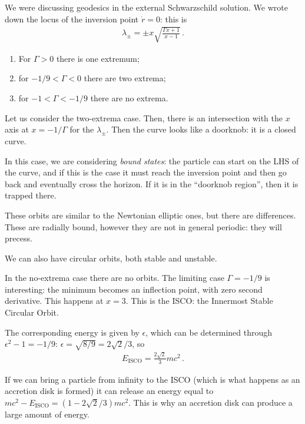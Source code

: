 \documentclass[main.tex]{subfiles}
\begin{document}


We were discussing geodesics in the external Schwarzschild solution. 
We wrote down the locus of the inversion point \(\dot{r} = 0\): this is 
%
\begin{align}
\lambda_{\pm} = \pm x \sqrt{\frac{\Gamma x + 1}{x-1}}
\,.
\end{align}

\begin{enumerate}
    \item For \(\Gamma > 0\) there is one extremum;
    \item for \(- 1/9 < \Gamma < 0\) there are two extrema;
    \item for \(-1 < \Gamma < - 1/9\) there are no extrema. 
\end{enumerate}

Let us consider the two-extrema case. Then, there is an intersection with the \(x\) axis at \(x = - 1/ \Gamma \) for the \(\lambda_{\pm }\). 
Then the curve looks like a doorknob: it is a closed curve. 

In this case, we are considering \emph{bound states}: the particle can start on the LHS of the curve, and if this is the case it must reach the inversion point and then go back and eventually cross the horizon.
If it is in the ``doorknob region'', then it is trapped there. 

These orbits are similar to the Newtonian elliptic ones, but there are differences. These are radially bound, however they are not in general periodic: they will precess.

We can also have circular orbits, both stable and unstable. 

In the no-extrema case there are no orbits. The limiting case \(\Gamma = - 1/9\) is interesting: the minimum becomes an inflection point, with zero second derivative.  
This happens at \(x = 3\). 
This is the ISCO: the Innermost Stable Circular Orbit.

The corresponding energy is given by \(\epsilon \), which can be determined through \(\epsilon^2 - 1 = - 1/9\): \(\epsilon = \sqrt{8/9} =  2 \sqrt{2}  /3\), so 
%
\begin{align}
E _{\text{ISCO}} = \frac{2 \sqrt{2}}{3} mc^2
\,.
\end{align}

If we can bring a particle from infinity to the ISCO (which is what happens as an accretion disk is formed) it can release an energy equal to \(mc^2 - E _{\text{ISCO}} = (1 - 2 \sqrt{2} / 3) m c^2\). This is why an accretion disk can produce a large amount of energy. 
\end{document}
